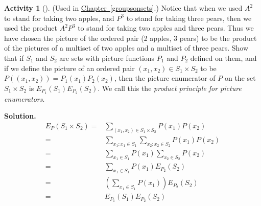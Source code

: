 \documentclass[10pt,]{book}
\theoremstyle{plain}
\theoremstyle{definition}
\newtheorem{activity}[project]{Activity}
\numberwithin{equation}{chapter}
\newcommand{\amp}{&}
\begin{document}
\begin{activity}[]\label{activity-155}
(Used in \hyperref[groupsonsets]{Chapter~\ref{groupsonsets}}.) Notice that when we used \(A^2\) to stand for taking two apples, and \(P^3\) to stand for taking three pears, then we used the product \(A^2P^3\) to stand for taking two apples and three pears. Thus we have chosen the picture of the ordered pair (2 apples, 3 pears) to be the product of the pictures of a multiset of two apples and a multiset of three pears. Show that if \(S_1\) and \(S_2\) are sets with picture functions \(P_1\) and \(P_2\) defined on them, and if we define the picture of an ordered pair \((x_1,x_2)\in S_1\times S_2\) to be \(P((x_1,x_2))= P_1(x_1)P_2(x_2)\), then the picture enumerator of \(P\) on the set \(S_1\times S_2\) is \(E_{P_1}(S_1)E_{P_2}(S_2)\). We call this the \emph{product principle for picture enumerators}.%
\par\medskip\noindent%
\textbf{Solution.}\quad %
\begin{align*}
E_P(S_1\times S_2) =\amp \sum_{(x_1,x_2)\in S_1\times
S_2} P(x_1)P(x_2)\\
=\amp
\sum_{x_1:x_1\in S_1}\sum_{x_2:x_2\in S_2} P(x_1)P(x_2)\\
=\amp \sum_{x_1\in S_1}P(x_1)\sum_{x_2\in S_2}P(x_2)\\
=\amp \sum_{x_1\in S_1} P(x_1) E_{P_2}(S_2)\\
=\amp \left(\sum_{x_1\in S_1} P(x_1)\right)E_{P_2}(S_2)\\
=\amp E_{P_1}(S_1)E_{P_2}(S_2)
\end{align*}
%
\end{activity}
\typeout{************************************************}
\typeout{************************************************}
\end{document}
